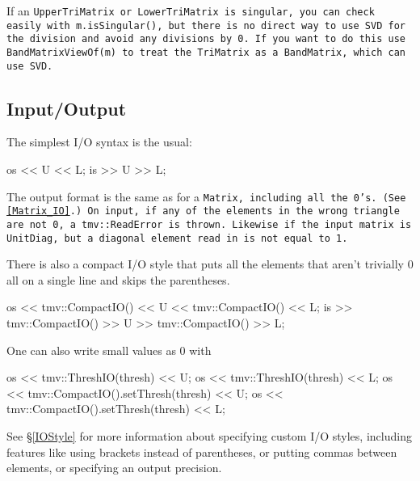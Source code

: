If an \tt{UpperTriMatrix} or \tt{LowerTriMatrix} is singular, 
you can check easily with \tt{m.isSingular()},
but there is no direct way to use SVD for the division and avoid any
divisions by 0.  If you want to do this use \tt{BandMatrixViewOf(m)} to 
treat the \tt{TriMatrix} as a \tt{BandMatrix}, which can use SVD.

\subsection{Input/Output}
\label{TriMatrix_IO}

The simplest I/O syntax is the usual:
\begin{tmvcode}
os << U << L;
is >> U >> L;
\end{tmvcode}
The output format is the same as for a \tt{Matrix}, including all the 0's.
(See \ref{Matrix_IO}.)  On input, if any of the elements in the wrong triangle 
are not 0, a \tt{tmv::ReadError} is thrown.  Likewise if the input matrix is
\tt{UnitDiag}, but a diagonal element read in is not equal to 1.

There is also a compact I/O style that puts all the elements that aren't trivially 0 all on a single line and skips the parentheses. 
\begin{tmvcode}
os << tmv::CompactIO() << U << tmv::CompactIO() << L;
is >> tmv::CompactIO() >> U >> tmv::CompactIO() >> L;
\end{tmvcode}

One can also write small values as 0 with
\begin{tmvcode}
os << tmv::ThreshIO(thresh) << U;
os << tmv::ThreshIO(thresh) << L;
os << tmv::CompactIO().setThresh(thresh) << U;
os << tmv::CompactIO().setThresh(thresh) << L;
\end{tmvcode}

See \S\ref{IOStyle} for more information about specifying custom I/O styles, including
features like using brackets instead of parentheses, or putting commas between elements,
or specifying an output precision.  
